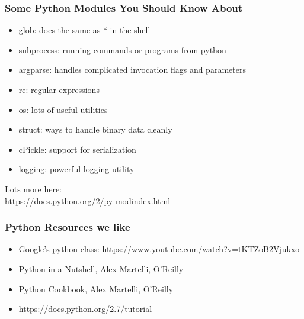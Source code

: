 \documentclass[10pt]{beamer}
\begin{document}
\begin{frame}[fragile]
\frametitle{Some Python Modules You Should Know About}

\begin{itemize}
\item glob: does the same as * in the shell
\item subprocess: running commands or programs from python
\item argparse: handles complicated invocation flags and parameters
\item re: regular expressions 
\item os: lots of useful utilities
\item struct: ways to handle binary data cleanly
\item cPickle: support for serialization
\item logging: powerful logging utility
\end{itemize}

\vspace{5mm}
Lots more here:\\
https://docs.python.org/2/py-modindex.html

\end{frame}

\begin{frame}[fragile]
\frametitle{Python Resources we like}

\begin{itemize}
\item Google's python class: https://www.youtube.com/watch?v=tKTZoB2Vjukxo
\item Python in a Nutshell, Alex Martelli, O'Reilly
\item Python Cookbook, Alex Martelli, O'Reilly
\item https://docs.python.org/2.7/tutorial
\end{itemize}

\end{frame}
\end{document}
